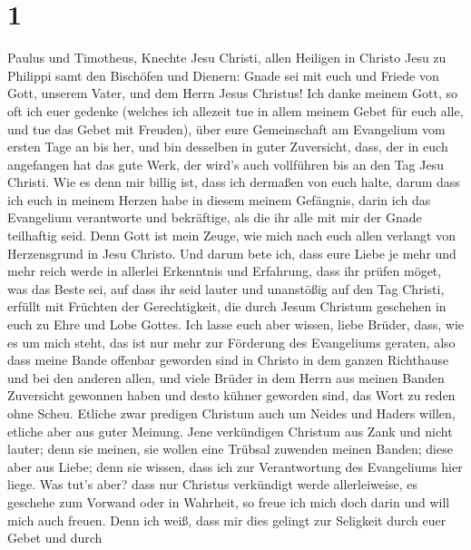 \hypertarget{section}{%
\section{1}\label{section}}

 Paulus und Timotheus, Knechte Jesu Christi, allen Heiligen
in Christo Jesu zu Philippi samt den Bischöfen und Dienern: 
Gnade sei mit euch und Friede von Gott, unserem Vater, und dem Herrn
Jesus Christus!  Ich danke meinem Gott, so oft ich euer
gedenke  (welches ich allezeit tue in allem meinem Gebet für
euch alle, und tue das Gebet mit Freuden),  über eure
Gemeinschaft am Evangelium vom ersten Tage an bis her,  und
bin desselben in guter Zuversicht, dass, der in euch angefangen hat das
gute Werk, der wird's auch vollführen bis an den Tag Jesu Christi.
 Wie es denn mir billig ist, dass ich dermaßen von euch
halte, darum dass ich euch in meinem Herzen habe in diesem meinem
Gefängnis, darin ich das Evangelium verantworte und bekräftige, als die
ihr alle mit mir der Gnade teilhaftig seid.  Denn Gott ist
mein Zeuge, wie mich nach euch allen verlangt von Herzensgrund in Jesu
Christo.  Und darum bete ich, dass eure Liebe je mehr und
mehr reich werde in allerlei Erkenntnis und Erfahrung, 
dass ihr prüfen möget, was das Beste sei, auf dass ihr seid lauter und
unanstößig auf den Tag Christi,  erfüllt mit Früchten der
Gerechtigkeit, die durch Jesum Christum geschehen in euch zu Ehre und
Lobe Gottes.  Ich lasse euch aber wissen, liebe Brüder,
dass, wie es um mich steht, das ist nur mehr zur Förderung des
Evangeliums geraten,  also dass meine Bande offenbar
geworden sind in Christo in dem ganzen Richthause und bei den anderen
allen,  und viele Brüder in dem Herrn aus meinen Banden
Zuversicht gewonnen haben und desto kühner geworden sind, das Wort zu
reden ohne Scheu.  Etliche zwar predigen Christum auch um
Neides und Haders willen, etliche aber aus guter Meinung. 
Jene verkündigen Christum aus Zank und nicht lauter; denn sie meinen,
sie wollen eine Trübsal zuwenden meinen Banden;  diese aber
aus Liebe; denn sie wissen, dass ich zur Verantwortung des Evangeliums
hier liege.  Was tut's aber? dass nur Christus verkündigt
werde allerleiweise, es geschehe zum Vorwand oder in Wahrheit, so freue
ich mich doch darin und will mich auch freuen.  Denn ich
weiß, dass mir dies gelingt zur Seligkeit durch euer Gebet und durch
